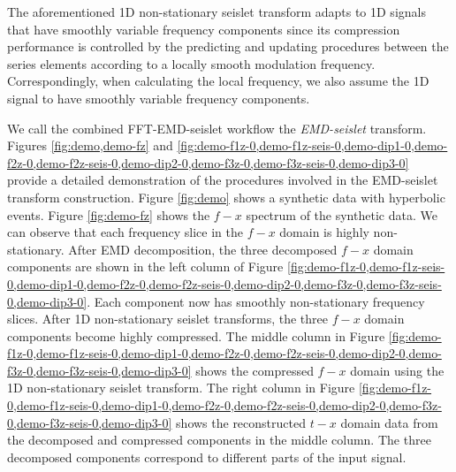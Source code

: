 The aforementioned 1D non-stationary seislet transform adapts to 1D signals that have smoothly variable  frequency components since its compression performance is controlled by the predicting and updating procedures between the series elements according to a locally smooth modulation frequency. Correspondingly, when calculating the local frequency, we also assume the 1D signal to have smoothly variable frequency components.  


We call the combined FFT-EMD-seislet workflow the \emph{EMD-seislet} transform. Figures \ref{fig:demo,demo-fz} and \ref{fig:demo-f1z-0,demo-f1z-seis-0,demo-dip1-0,demo-f2z-0,demo-f2z-seis-0,demo-dip2-0,demo-f3z-0,demo-f3z-seis-0,demo-dip3-0} provide a detailed demonstration of the procedures involved in the EMD-seislet transform construction. Figure \ref{fig:demo} shows a synthetic data with hyperbolic events. Figure \ref{fig:demo-fz} shows the $f-x$ spectrum of the synthetic data.  We can observe that each frequency slice in the $f-x$ domain is highly non-stationary. After EMD decomposition, the three decomposed $f-x$ domain components are shown in the left column of Figure \ref{fig:demo-f1z-0,demo-f1z-seis-0,demo-dip1-0,demo-f2z-0,demo-f2z-seis-0,demo-dip2-0,demo-f3z-0,demo-f3z-seis-0,demo-dip3-0}. Each component now has smoothly non-stationary frequency slices. After 1D non-stationary seislet transforms, the three $f-x$ domain components become highly compressed. The middle column in Figure \ref{fig:demo-f1z-0,demo-f1z-seis-0,demo-dip1-0,demo-f2z-0,demo-f2z-seis-0,demo-dip2-0,demo-f3z-0,demo-f3z-seis-0,demo-dip3-0} shows the compressed $f-x$ domain using the 1D non-stationary seislet transform.  The right column in Figure \ref{fig:demo-f1z-0,demo-f1z-seis-0,demo-dip1-0,demo-f2z-0,demo-f2z-seis-0,demo-dip2-0,demo-f3z-0,demo-f3z-seis-0,demo-dip3-0} shows the reconstructed $t-x$ domain data from the decomposed and compressed components in the middle column. The three decomposed components correspond to different parts of the input signal.%

